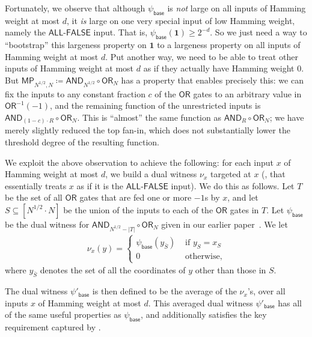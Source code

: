 \documentclass{toc}
\newcommand{\OR}{\mathsf{ OR}}
\newcommand{\AND}{\mathsf{AND}}
\begin{document}
Fortunately, we observe that although $\psi_{\textsf{base}}$ is \emph{not} large on all inputs of Hamming weight at most $d$, it
\emph{is} large on one very special input of low Hamming weight, namely the $\textsf{ALL-FALSE}$ input. 
That is, $\psi_{\textsf{base}}(\mathbf{1}) \geq 2^{-d}$. 
So we just need a way to ``bootstrap'' this largeness property on $\mathbf{1}$ to 
a largeness property on all inputs of Hamming weight at most $d$.
Put another way, we need to be able to treat other inputs of Hamming weight at most $d$ as if they actually have Hamming weight 0.
But
$\mathsf{MP}_{N^{1/2}, N} \coloneqq  \AND_{N^{1/2}} \circ \OR_N$ has a property that enables precisely this: we can fix the inputs to any constant fraction $c$ of the $\OR$ gates to an arbitrary value in $\OR^{-1}(-1)$,
and the remaining function of the unrestricted inputs is $\AND_{(1-c) \cdot R} \circ \OR_N$. This  is ``almost'' the same
function as $\AND_R \circ \OR_N$; we have merely
slightly reduced the top fan-in, which does not substantially lower the threshold degree of the resulting function. 

We exploit the above observation
to achieve the following: for each input $x$ of Hamming weight at most $d$, we build a dual witness $\nu_x$
targeted at $x$ (\ie, that essentially treats $x$ as if it is the $\textsf{ALL-FALSE}$ input). We do this as follows. Let $T$ be the set of all $\OR$ gates
that are
fed one or more $-1$s by $x$, and let $S \subseteq [N^{1/2} \cdot N]$ be the union of the inputs
to each of the $\OR$ gates in $T$. Let $\psi_{\textsf{base}}$ be the dual witness for $\AND_{N^{1/2} - |T|} \circ \OR_N$ given in our
%
earlier paper~\cite{bt14}.  %
We let 
\begin{align*} \nu_x(y)=\begin{cases} \psi_{\textsf{base}}(y_{\bar{S}}) & \text{ if } y_{S} = x_S\\
0 & \text{ otherwise,} \end{cases}\end{align*} 
%
where $y_{\bar{S}}$ denotes the set of all the coordinates of $y$ other than those in $S$.

The dual witness $\psi'_{\textsf{base}}$ is then defined to be the average of the $\nu_x$'s, over all inputs $x$ of Hamming weight at most $d$. 
This averaged dual witness $\psi'_{\textsf{base}}$ has all of the same useful properties as $\psi_{\textsf{base}}$, and additionally satisfies the key requirement captured by .
\end{document}
